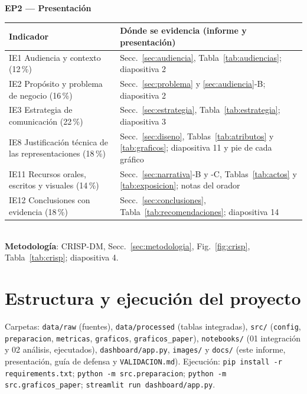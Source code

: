 \documentclass[conference,a4paper]{IEEEtran}
\begin{document}
\noindent\begin{minipage}{\columnwidth}\centering\footnotesize
\textbf{EP2 --- Presentación}\\[2pt]
\begin{tabularx}{\columnwidth}{@{}P{3.1cm}L@{}}
\toprule
Indicador & Dónde se evidencia (informe y presentación)\\
\midrule
IE1 Audiencia y contexto (12\,\%) & Secc.~\ref{sec:audiencia}, Tabla~\ref{tab:audiencias}; diapositiva 2\\
IE2 Propósito y problema de negocio (16\,\%) & Secc.~\ref{sec:problema} y \ref{sec:audiencia}-B; diapositiva 2\\
IE3 Estrategia de comunicación (22\,\%) & Secc.~\ref{sec:estrategia}, Tabla~\ref{tab:estrategia}; diapositiva 3\\
IE8 Justificación técnica de las representaciones (18\,\%) & Secc.~\ref{sec:diseno}, Tablas~\ref{tab:atributos} y \ref{tab:graficos}; diapositiva 11 y pie de cada gráfico\\
IE11 Recursos orales, escritos y visuales (14\,\%) & Secc.~\ref{sec:narrativa}-B y -C, Tablas~\ref{tab:actos} y \ref{tab:exposicion}; notas del orador\\
IE12 Conclusiones con evidencia (18\,\%) & Secc.~\ref{sec:conclusiones}, Tabla~\ref{tab:recomendaciones}; diapositiva 14\\
\bottomrule
\end{tabularx}\\[6pt]
\textbf{Metodología}: CRISP-DM, Secc.~\ref{sec:metodologia}, Fig.~\ref{fig:crisp}, Tabla~\ref{tab:crisp}; diapositiva 4.
\end{minipage}\par\medskip

\section{Estructura y ejecución del proyecto}
Carpetas: \texttt{data/raw} (fuentes), \texttt{data/processed} (tablas integradas), \texttt{src/} (\texttt{config}, \texttt{preparacion}, \texttt{metricas}, \texttt{graficos}, \texttt{graficos\_paper}), \texttt{notebooks/} (01 integración y 02 análisis, ejecutados), \texttt{dashboard/app.py}, \texttt{images/} y \texttt{docs/} (este informe, presentación, guía de defensa y \texttt{VALIDACION.md}). Ejecución: \texttt{pip install -r requirements.txt}; \texttt{python -m src.preparacion}; \texttt{python -m src.graficos\_paper}; \texttt{streamlit run dashboard/app.py}.
\end{document}
